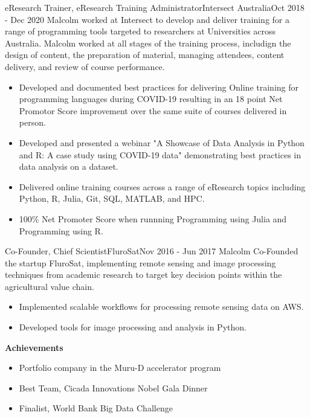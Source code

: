 \begin{cventry}{eResearch Trainer, eResearch Training Administrator}{Intersect Australia}{}{Oct 2018 - Dec 2020}
  Malcolm worked at Intersect to develop and deliver training 
  for a range of programming tools
  targeted to researchers at Universities across Australia.
  Malcolm worked at all stages of the training process, 
  includign the design of content, 
  the preparation of material, managing attendees, 
  content delivery, and review of course performance.
  \begin{itemize}
    \item Developed and documented best practices for delivering Online
      training for programming languages during COVID-19 resulting in an
      18 point Net Promotor Score improvement over 
      the same suite of courses delivered in person.
    \item Developed and presented a webinar
      {"A Showcase of Data Analysis in Python and R: A case study using COVID-19 data"}
      demonstrating best practices in data analysis on a dataset.
    \item Delivered online training courses across a range of eResearch topics
      including Python, R, Julia, Git, SQL, MATLAB, and HPC.
    \item 100\% Net Promoter Score when runnning Programming using Julia and Programming using R.
  \end{itemize}
\end{cventry}

\begin{cventry}{Co-Founder, Chief Scientist}{FluroSat}{}{Nov 2016 - Jun 2017}
  Malcolm Co-Founded the startup FluroSat, 
  implementing remote sensing and image processing techniques 
  from academic research to target key decision points 
  within the agricultural value chain.
  \begin{itemize}
    \item Implemented scalable workflows for processing remote sensing data on AWS.
    \item Developed tools for image processing and analysis in Python.
    \end{itemize}
  \textbf{Achievements}
  \begin{itemize}
      \item Portfolio company in the Muru-D accelerator program
      \item Best Team, Cicada Innovations Nobel Gala Dinner
      \item Finalist, World Bank Big Data Challenge
  \end{itemize}
\end{cventry}

